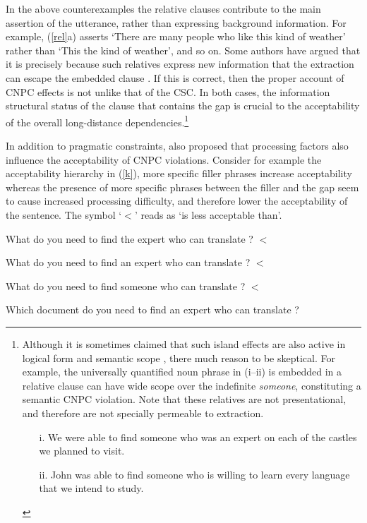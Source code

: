 \documentclass[output=paper]{langsci/langscibook}
\begin{document}
In the above counterexamples the relative clauses contribute to the main assertion of the utterance, rather than expressing background information. For example, (\ref{rel}a) asserts `There are many people who like this kind of weather' rather than `This the kind of weather', and so on.
Some authors have argued that it is precisely because such relatives
express new information that the extraction can escape the embedded clause
  \citep{shirlappin,kuno87,Dean,goldberg13}.  If this is correct, then the proper 
  account of CNPC effects is not unlike that of the CSC. In both cases, 
  the information structural status of the clause that contains the gap is crucial
  to the acceptability of the overall long-distance dependencies.\footnote{Although it is sometimes claimed
   that
such  island effects are also active in logical form and semantic scope \citep{may85,ruys,fox,sab,katzira}, 
  there much reason to be skeptical.  For example, the universally quantified noun phrase  in (i--ii)  is embedded in a relative clause can have wide scope over the indefinite \emph{someone}, constituting a semantic CNPC violation. Note that these relatives are not presentational, and therefore are not specially permeable to extraction.

\begin{itemize}
\item[i.]  We were able to find someone who was an expert on each of the
castles we planned to visit.  \citep[304]{mrs}

\item[ii.] John was able to find someone  who is willing to learn every  language
that we intend to study.
\citep{chavesrnr}
\end{itemize}}

 
 
  
In addition to pragmatic constraints,  \citet{kluender92,kluender} also proposed that 
processing factors also  influence the acceptability of    CNPC violations.
Consider for example the acceptability hierarchy in  (\ref{k}),  more specific filler phrases increase acceptability whereas    the presence of more specific phrases between the filler and the gap seem  to cause increased processing difficulty, and therefore   lower the acceptability of the sentence.  The symbol `$<$' reads as `is less acceptable than'.

\ea \label{k}
\ea What do you need to find the expert who can translate \spc?  $<$
\item What do you need to find an expert who can translate \spc?   $<$
\item What do you need to find someone who can translate \spc? $<$
\item Which document do you need to find an expert who can translate \spc?
\z
\z
\end{document}
